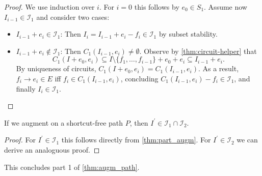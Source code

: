 \begin{proof}
    We use induction over $i$. For $i=0$ this follows by $e_0 \in S_1$.
    Assume now $I_{i-1} \in \mathcal I_1$ and consider two cases:
    \begin{itemize}
        \item $I_{i-1}+e_i \in \mathcal I_1$:
              Then $I_i = I_{i-1}+e_i-f_i \in \mathcal I_1$ by subset stability.
        \item $I_{i-1}+e_i \not \in \mathcal I_1$: Then $C_1(I_{i-1},e_i) \neq \emptyset$.
              Observe by \autoref{thm:circuit-helper} that
              \[
                  C_1(I + e_0, e_i)\subseteq I \setminus \{f_1, \dots, f_{i-1}\}+e_0+e_i \subseteq I_{i-1}+e_i.
              \]
              By uniqueness of circuits, $C_1(I+e_0,e_i)=C_1(I_{i-1},e_i)$.
              As a result, $f_i \rightarrow e_i \in E$ iff $f_i \in C_1(I_{i-1},e_i)$,
              concluding $C_1(I_{i-1},e_i)-f_i \in \mathcal I_1$, and finally $I_i \in \mathcal I_1$.
    \end{itemize}
\end{proof}
\begin{corollary}
    If we augment on a shortcut-free path $P$, then $I^\prime \in \mathcal I_1 \cap \mathcal I_2$.
\end{corollary}
\begin{proof}
    For $I^\prime \in \mathcal I_1$ this follows directly from \autoref{thm:part_augm}.
    For $I^\prime \in \mathcal I_2$ we can derive an analoguous proof.
\end{proof}
This concludes part 1 of \autoref{thm:augm_path}.


